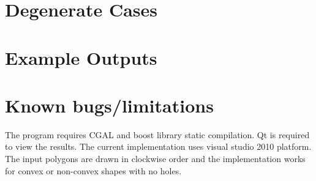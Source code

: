 \documentclass[11pt]{article}
\begin{document}
\section{Degenerate Cases}

\section{Example Outputs}

\section{Known bugs/limitations}
The program requires CGAL and boost library static compilation. Qt is required to view the results. The current implementation uses visual studio 2010 platform. \\
The input polygons are drawn in clockwise order and the implementation works for convex or non-convex shapes with no holes.\\





\end{document}
